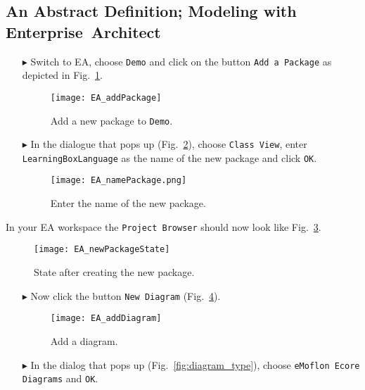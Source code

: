 \visHeader
\subsection[An Abstract Definition (Visual)]{An Abstract Definition; Modeling with \mbox{Enterprise Architect}}

\begin{enumerate}
\item[$\blacktriangleright$] \hypertarget{static vis}{Switch} to EA, choose \texttt{Demo} and click on the button \texttt{Add a Package} as depicted in Fig.~\ref{fig:new_package}.

\begin{figure}[htbp]
	\centering
  \texttt{[image: EA\_addPackage]}
	\caption{Add a new package to \texttt{Demo}.}
	\label{fig:new_package}
\end{figure}

\item[$\blacktriangleright$] In the dialogue that pops up (Fig.~\ref{fig:new_package_name}), choose \texttt{Class View}, enter \texttt{Learning\-Box\-Language} as the name of the new package and click \texttt{OK}.

\begin{figure}[htbp]
	\centering
    \texttt{[image: EA\_namePackage.png]}
	\caption{Enter the name of the new package.}
	\label{fig:new_package_name}
\end{figure}
\end{enumerate}
\FloatBarrier

In your EA workspace the \texttt{Project Browser} should now look like Fig.~\ref{fig:new_package_completed}.
\begin{figure}[htbp]
	\centering
  \texttt{[image: EA\_newPackageState]}
	\caption{State after creating the new package.}
	\label{fig:new_package_completed}
\end{figure}
\FloatBarrier

\vspace{1cm}

\begin{enumerate}
\item[$\blacktriangleright$] Now click the button \texttt{New Diagram} (Fig.~\ref{fig:diagram}).
\vspace{0.5cm}

\begin{figure}[htbp]
	\centering
  \texttt{[image: EA\_addDiagram]}
	\caption{Add a diagram.}
	\label{fig:diagram}
\end{figure}
\FloatBarrier

\vspace{1cm}

\item[$\blacktriangleright$] In the dialog that pops up (Fig.~\ref{fig:diagram_type}), choose \texttt{eMoflon Ecore Diagrams} and \texttt{OK}.
\end{enumerate}

